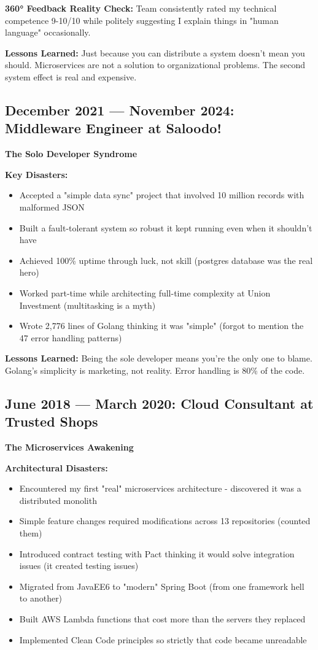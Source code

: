 \documentclass[10pt,a4paper]{article}
\begin{document}
\textbf{360° Feedback Reality Check:} Team consistently rated my technical competence 9-10/10 while politely suggesting I explain things in "human language" occasionally.

\textbf{Lessons Learned:} Just because you can distribute a system doesn't mean you should. Microservices are not a solution to organizational problems. The second system effect is real and expensive.

\subsection{December 2021 — November 2024: Middleware Engineer at Saloodo!}
\textbf{The Solo Developer Syndrome}

\textbf{Key Disasters:}
\begin{itemize}[leftmargin=*,itemsep=1pt]
    \item Accepted a "simple data sync" project that involved 10 million records with malformed JSON
    \item Built a fault-tolerant system so robust it kept running even when it shouldn't have
    \item Achieved 100\% uptime through luck, not skill (postgres database was the real hero)
    \item Worked part-time while architecting full-time complexity at Union Investment (multitasking is a myth)
    \item Wrote 2,776 lines of Golang thinking it was "simple" (forgot to mention the 47 error handling patterns)
\end{itemize}

\textbf{Lessons Learned:} Being the sole developer means you're the only one to blame. Golang's simplicity is marketing, not reality. Error handling is 80\% of the code.

\subsection{June 2018 — March 2020: Cloud Consultant at Trusted Shops}
\textbf{The Microservices Awakening}

\textbf{Architectural Disasters:}
\begin{itemize}[leftmargin=*,itemsep=1pt]
    \item Encountered my first "real" microservices architecture - discovered it was a distributed monolith
    \item Simple feature changes required modifications across 13 repositories (counted them)
    \item Introduced contract testing with Pact thinking it would solve integration issues (it created testing issues)
    \item Migrated from JavaEE6 to "modern" Spring Boot (from one framework hell to another)
    \item Built AWS Lambda functions that cost more than the servers they replaced
    \item Implemented Clean Code principles so strictly that code became unreadable
\end{itemize}
\end{document}
